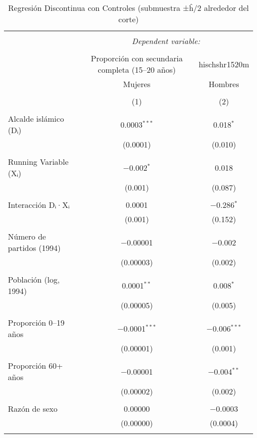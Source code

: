 
\begin{table}[ht!] \centering 
  \caption{Regresión Discontinua con Controles (submuestra ±ĥ/2 alrededor del corte)} 
  \label{tab:rd_submuestra_h2_mujeres_hombres} 
\begin{tabular}{@{\extracolsep{5pt}}lcc} 
\\[-1.8ex]\hline 
\hline \\[-1.8ex] 
 & \multicolumn{2}{c}{\textit{Dependent variable:}} \\ 
\cline{2-3} 
\\[-1.8ex] & Proporción con secundaria completa (15–20 años) & hischshr1520m \\ 
 & Mujeres & Hombres \\ 
\\[-1.8ex] & (1) & (2)\\ 
\hline \\[-1.8ex] 
 Alcalde islámico (Dᵢ) & 0.0003$^{***}$ & 0.018$^{*}$ \\ 
  & (0.0001) & (0.010) \\ 
  & & \\ 
 Running Variable (Xᵢ) & $-$0.002$^{*}$ & 0.018 \\ 
  & (0.001) & (0.087) \\ 
  & & \\ 
 Interacción Dᵢ·Xᵢ & 0.0001 & $-$0.286$^{*}$ \\ 
  & (0.001) & (0.152) \\ 
  & & \\ 
 Número de partidos (1994) & $-$0.00001 & $-$0.002 \\ 
  & (0.00003) & (0.002) \\ 
  & & \\ 
 Población (log, 1994) & 0.0001$^{**}$ & 0.008$^{*}$ \\ 
  & (0.00005) & (0.005) \\ 
  & & \\ 
 Proporción 0–19 años & $-$0.0001$^{***}$ & $-$0.006$^{***}$ \\ 
  & (0.00001) & (0.001) \\ 
  & & \\ 
 Proporción 60+ años & $-$0.00001 & $-$0.004$^{**}$ \\ 
  & (0.00002) & (0.002) \\ 
  & & \\ 
 Razón de sexo & 0.00000 & $-$0.0003 \\ 
  & (0.00000) & (0.0004) \\ 
  & & \\ 

\end{tabular}
\end{table}
